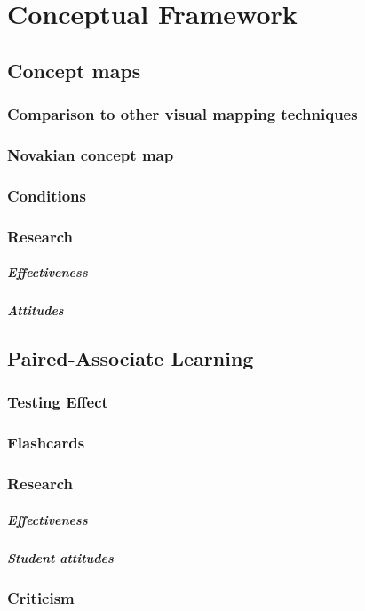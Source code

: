\chapter{Conceptual Framework}

\section{Concept maps}

\subsection{Comparison to other visual mapping techniques}

\subsection{Novakian concept map}

\subsection{Conditions}

\subsection{Research}

\paragraph{Effectiveness}

\paragraph{Attitudes}

\section{Paired-Associate Learning}

\subsection{Testing Effect}

\subsection{Flashcards}

\subsection{Research}

\paragraph{Effectiveness}

\paragraph{Student attitudes}

\subsection{Criticism}
